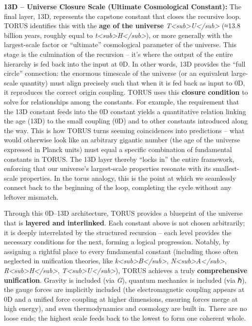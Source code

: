 \documentclass[
]{article}
\begin{document}
\textbf{13D -- Universe Closure Scale (Ultimate Cosmological Constant):}
The final layer, 13D, represents the capstone constant that closes the
recursive loop. TORUS identifies this with the \textbf{age of the
universe} \emph{T\textless sub\textgreater U\textless/sub\textgreater{}}
(≈13.8 billion years, roughly equal to
\emph{t\textless sub\textgreater H\textless/sub\textgreater{}}), or more
generally with the largest-scale factor or ``ultimate'' cosmological
parameter of the universe. This stage is the culmination of the
recursion -- it's where the output of the entire hierarchy is fed back
into the input at 0D. In other words, 13D provides the ``full circle''
connection: the enormous timescale of the universe (or an equivalent
large-scale quantity) must align precisely such that when it is fed back
as input to 0D, it reproduces the correct origin coupling. TORUS uses
this \textbf{closure condition} to solve for relationships among the
constants. For example, the requirement that the 13D constant feeds into
the 0D constant yields a quantitative relation linking the age (13D) to
the small coupling (0D) and to other constants introduced along the way.
This is how TORUS turns seeming coincidences into predictions -- what
would otherwise look like an arbitrary gigantic number (the age of the
universe expressed in Planck units) must equal a specific combination of
fundamental constants in TORUS. The 13D layer thereby ``locks in'' the
entire framework, enforcing that our universe's largest-scale properties
resonate with its smallest-scale properties. In the torus analogy, this
is the point at which we seamlessly connect back to the beginning of the
loop, completing the cycle without any leftover mismatch.

Through this 0D--13D architecture, TORUS provides a blueprint of the
universe that is \textbf{layered and interlinked}. Each constant above
is not chosen arbitrarily; it is deeply interrelated by the structured
recursion -- each level provides the necessary conditions for the next,
forming a logical progression. Notably, by assigning a rightful place to
every fundamental constant (including those often neglected in
unification theories, like
\emph{k\textless sub\textgreater B\textless/sub\textgreater{}},
\emph{N\textless sub\textgreater A\textless/sub\textgreater{}},
\emph{R\textless sub\textgreater H\textless/sub\textgreater{}},
\emph{T\textless sub\textgreater U\textless/sub\textgreater{}}), TORUS
achieves a truly \textbf{comprehensive unification}. Gravity is included
(via \emph{G}), quantum mechanics is included (via ℏ), the gauge forces
are implicitly included (the electromagnetic coupling appears at 0D and
a unified force coupling at higher dimensions, ensuring forces merge at
high energy), and even thermodynamics and cosmology are built in. There
are no loose ends; the highest scale feeds back to the lowest to form
one coherent whole.
\end{document}
